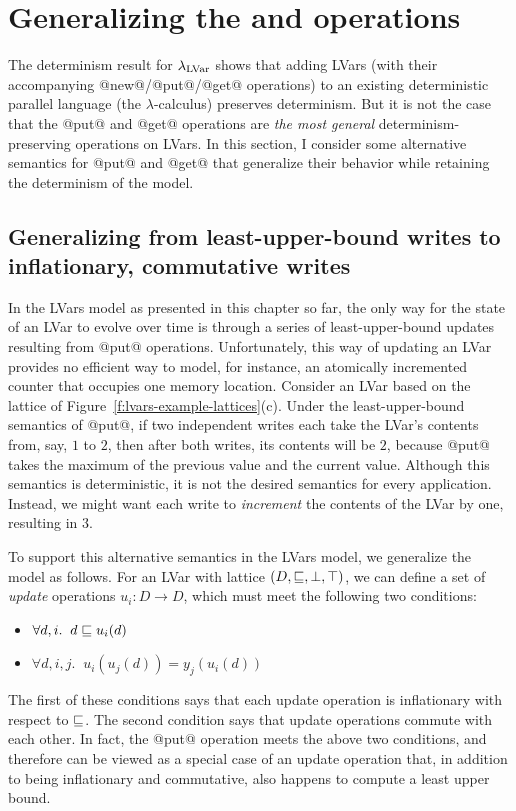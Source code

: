 \section{Generalizing the  and  operations}\label{s:lvars-generalizing}

The determinism result for $\lambda_{\textrm{LVar}}$ shows that adding LVars (with
their accompanying @new@/@put@/@get@ operations) to an existing
deterministic parallel language (the $\lambda$-calculus) preserves
determinism.  But it is not the case that the @put@ and @get@
operations are \emph{the most general} determinism-preserving
operations on LVars.  In this section, I consider some alternative
semantics for @put@ and @get@ that generalize their behavior while
retaining the determinism of the model.

\subsection{Generalizing from least-upper-bound writes to inflationary, commutative writes}\label{subsection:lvars-generalizing-from-least-upper-bound-writes}

In the LVars model as presented in this chapter so far, the only way
for the state of an LVar to evolve over time is through a series of
least-upper-bound updates resulting from @put@ operations.
Unfortunately, this way of updating an LVar provides no efficient way
to model, for instance, an atomically incremented counter that
occupies one memory location.  Consider an LVar based on the lattice
of Figure~\ref{f:lvars-example-lattices}(c).  Under the
least-upper-bound semantics of @put@, if two independent writes each
take the LVar's contents from, say, $1$ to $2$, then after both
writes, its contents will be $2$, because @put@ takes the maximum of
the previous value and the current value.  Although this semantics is
deterministic, it is not the desired semantics for every application.
Instead, we might want each write to \emph{increment} the contents of
the LVar by one, resulting in $3$.

To support this alternative semantics in the LVars model, we
generalize the model as follows.  For an LVar with lattice $(D,
\sqsubseteq, \bot, \top)$, we can define a set of \emph{update}
operations $u_i : D \rightarrow D$, which must meet the following two
conditions:
\begin{itemize}
\item $\forall d, i.     \;\; d \sqsubseteq u_i(d) $
\item $\forall d, i, j.  \;\; u_i(u_j(d)) = y_j(u_i(d)) $
\end{itemize}
The first of these conditions says that each update operation is
inflationary with respect to $\sqsubseteq$.  The second condition says
that update operations commute with each other.  In fact, the @put@
operation meets the above two conditions, and therefore can be viewed
as a special case of an update operation that, in addition to being
inflationary and commutative, also happens to compute a least upper
bound.

